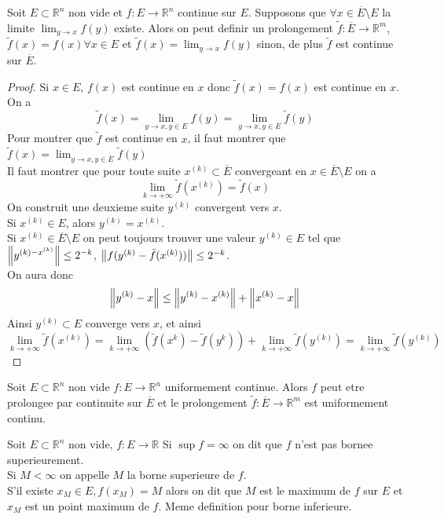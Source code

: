 \documentclass[../main.tex]{subfiles}
\begin{document}
\begin{thm}
	Soit $E\subset \mathbb{R}^n$ non vide et $f: E \to \mathbb{R}^n$ continue sur $E$. Supposons que $\forall x \in \overline{E}\setminus E$ la limite $\lim_{y \to  x} f( y)  $ existe. Alors on peut definir un prolongement $\tilde f: \overline{E} \to \mathbb{R}^m$, $\tilde f( x) =f( x)\forall x \in E$ et $\tilde f ( x) = \lim_{y \to x} f( y) $ sinon, de plus $\tilde f $ est continue sur $\overline{E}$.
 
	
\end{thm}
\begin{proof}
	Si $x \in E$, $f( x) $ est continue en $x$ donc $\tilde f( x) =f( x) $ est continue en $x$.
	On a
	\[ 
		\tilde f ( x) = \lim_{y \to x, y \in E} f( y) = \lim_{y \to x, y \in E} \tilde f( y) 
	\]
	Pour montrer que $\tilde f$ est continue en $x$, il faut montrer que $\tilde f( x) = \lim_{y \to x, y \in \overline{E}} \tilde f ( y) $\\
	Il faut montrer que pour toute suite $x^{(k ) } \subset \overline{E}$ convergeant en $x \in \overline{E}\setminus E$ on a
	\[ 
		\lim_{k \to  + \infty} \tilde f( x^{( k) }) = \tilde f ( x) 	
	\]
	On construit une deuxieme suite $y^{( k) }$ convergent vers $x$.\\
	Si $x^{( k) } \in E$, alors $y^{( k) }= x^{( k) }$.\\
	Si $x^{( k) } \in \overline{E}\setminus E$ on peut toujours trouver une valeur $y^{( k) }\in E$ tel que $\left\lVert y^{( k) -x^{( k) }}\right\rVert\leq 2^{-k}$, $\left\lVert f( y^{( k) }- \tilde f ( x^{( k) }) )\right\rVert \leq 2^{-k}$.\\
	On aura donc
	\[ 
		\left\lVert y^{( k) }-x\right\rVert \leq \left\lVert y^{( k) }-x^{( k) }\right\rVert + \left\lVert x^{( k) }-x\right\rVert
	\]
	Ainsi $y^{( k) }\subset E$ converge vers $x$, et ainsi 
	\[ 
		\lim_{k \to  + \infty} \tilde f ( x^{( k) }) = \lim_{k \to  + \infty}  ( \tilde f ( x^{k}) -  \tilde f ( y^{k}) ) + \lim_{k \to  + \infty} \tilde f ( y^{( k )}) = \lim_{k \to  + \infty} \tilde f( y^{( k) }) 
	\]
	
	
	
\end{proof}
\begin{thm}
	Soit $E\subset \mathbb{R}^n$ non vide $f : E \to \mathbb{R}^n$ uniformement continue.
	Alors $f$ peut etre prolongee par continuite sur $\overline{E}$ et le prolongement $\tilde f :\overline{E}\to \mathbb{R}^m$ est uniformement continu.
	
\end{thm}
\begin{defn}
Soit $E \subset \mathbb{R}^n$ non vide, $f: E \to \mathbb{R} $
Si $\sup f= \infty$  on dit que $f $ n'est pas bornee superieurement.\\
Si $M< \infty $ on appelle $M$ la borne superieure de $f$.\\
S'il existe $x_M \in E, f( x_M) = M$ alors on dit que $M$ est le maximum de $f$ sur $E$ et $x_M $ est un point maximum de $f$.
Meme definition pour borne inferieure.

\end{defn}
\end{document}

